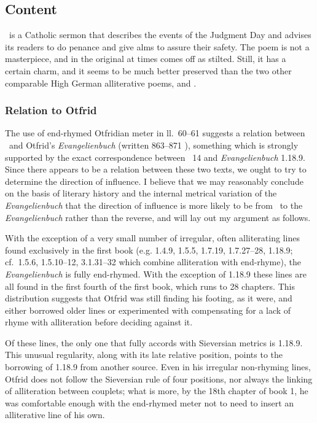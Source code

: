 \subsection{Content}

\Muspilli\ is a Catholic sermon that describes the events of the Judgment Day and advises its readers to do penance and give alms to assure their safety.  The poem is not a masterpiece, and in the original at times comes off as stilted.  Still, it has a certain charm, and it seems to be much better preserved than the two other comparable High German alliterative poems,  and .

\subsubsection{Relation to Otfrid}

The use of end-rhymed Otfridian meter in ll.~60--61 suggests a relation between \Muspilli\ and Otfrid’s \emph{Evangelienbuch} (written 863--871 \ce), something which is strongly supported by the exact correspondence between \Muspilli\ 14 and \emph{Evangelienbuch} 1.18.9.  Since there appears to be a relation between these two texts, we ought to try to determine the direction of influence.  I believe that we may reasonably conclude on the basis of literary history and the internal metrical variation of the \emph{Evangelienbuch} that the direction of influence is more likely to be from \Muspilli\ to the \emph{Evangelienbuch} rather than the reverse, and will lay out my argument as follows.

With the exception of a very small number of irregular, often alliterating lines found exclusively in the first book (e.g. 1.4.9, 1.5.5, 1.7.19, 1.7.27--28, 1.18.9; cf.~1.5.6, 1.5.10--12, 3.1.31--32 which combine alliteration with end-rhyme), the \emph{Evangelienbuch} is fully end-rhymed.  With the exception of 1.18.9 these lines are all found in the first fourth of the first book, which runs to 28 chapters.  This distribution suggests that Otfrid was still finding his footing, as it were, and either borrowed older lines or experimented with compensating for a lack of rhyme with alliteration before deciding against it.

Of these lines, the only one that fully accords with Sieversian metrics is 1.18.9.  This unusual regularity, along with its late relative position, points to the borrowing of 1.18.9 from another source.  Even in his irregular non-rhyming lines, Otfrid does not follow the Sieversian rule of four positions, nor always the linking of alliteration between couplets; what is more, by the 18th chapter of book 1, he was comfortable enough with the end-rhymed meter not to need to insert an alliterative line of his own.

